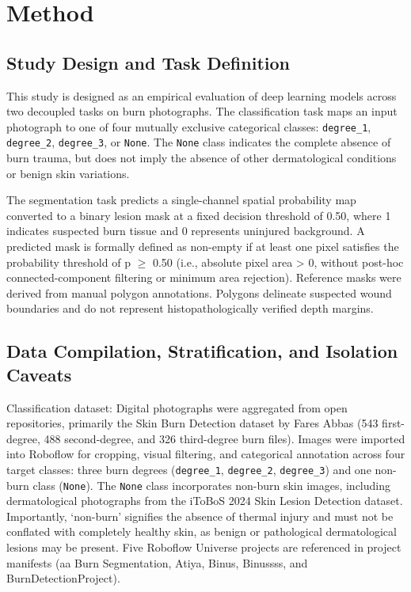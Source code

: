 \documentclass[11pt,a4paper]{article}
\begin{document}
\section{Method}

\subsection{Study Design and Task Definition}

This study is designed as an empirical evaluation of deep learning models across two decoupled tasks on burn photographs. The classification task maps an input photograph to one of four mutually exclusive categorical classes: \texttt{degree\_1}, \texttt{degree\_2}, \texttt{degree\_3}, or \texttt{None}. The \texttt{None} class indicates the complete absence of burn trauma, but does not imply the absence of other dermatological conditions or benign skin variations.

The segmentation task predicts a single-channel spatial probability map converted to a binary lesion mask at a fixed decision threshold of 0.50, where 1 indicates suspected burn tissue and 0 represents uninjured background. A predicted mask is formally defined as non-empty if at least one pixel satisfies the probability threshold of p $\ge$ 0.50 (i.e., absolute pixel area > 0, without post-hoc connected-component filtering or minimum area rejection). Reference masks were derived from manual polygon annotations. Polygons delineate suspected wound boundaries and do not represent histopathologically verified depth margins.

\subsection{Data Compilation, Stratification, and Isolation Caveats}

Classification dataset: Digital photographs were aggregated from open repositories, primarily the Skin Burn Detection dataset by Fares Abbas (543 first-degree, 488 second-degree, and 326 third-degree burn files). Images were imported into Roboflow for cropping, visual filtering, and categorical annotation across four target classes: three burn degrees (\texttt{degree\_1}, \texttt{degree\_2}, \texttt{degree\_3}) and one non-burn class (\texttt{None}). The \texttt{None} class incorporates non-burn skin images, including dermatological photographs from the iToBoS 2024 Skin Lesion Detection dataset. Importantly, `non-burn' signifies the absence of thermal injury and must not be conflated with completely healthy skin, as benign or pathological dermatological lesions may be present. Five Roboflow Universe projects are referenced in project manifests (aa Burn Segmentation, Atiya, Binus, Binussss, and BurnDetectionProject).
\end{document}
